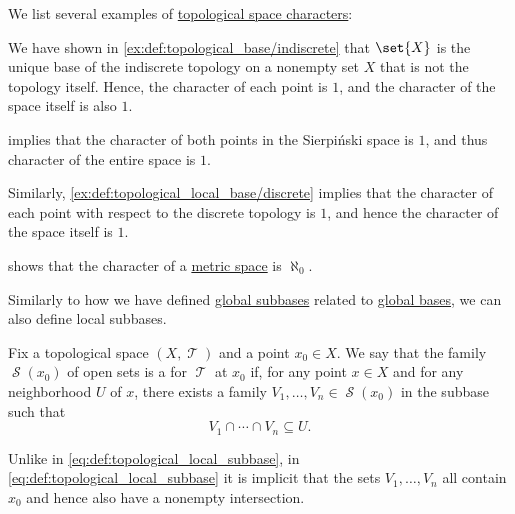 \begin{example}\label{ex:def:topological_space_character}
  We list several examples of \hyperref[def:topological_space_character]{topological space characters}:
  \begin{thmenum}
     We have shown in \cref{ex:def:topological_base/indiscrete} that \( \set{ X } \) is the unique base of the indiscrete topology on a nonempty set \( X \) that is not the topology itself. Hence, the character of each point is \( 1 \), and the character of the space itself is also \( 1 \).

      implies that the character of both points in the Sierpi\'nski space is \( 1 \), and thus character of the entire space is \( 1 \).

     Similarly, \cref{ex:def:topological_local_base/discrete} implies that the character of each point with respect to the discrete topology is \( 1 \), and hence the character of the space itself is \( 1 \).

      shows that the character of a \hyperref[def:metric_space]{metric space} is \( \aleph_0 \).
  \end{thmenum}
\end{example}

\begin{definition}\label{def:topological_local_subbase}\mimprovised
  Similarly to how we have defined \hyperref[def:topological_subbase]{global subbases} related to \hyperref[def:topological_base]{global bases}, we can also define local subbases.

  Fix a topological space \( (X, \mscrT) \) and a point \( x_0 \in X \). We say that the family \( \mscrS(x_0) \) of open sets is a  for \( \mscrT \) at \( x_0 \) if, for any point \( x \in X \) and for any neighborhood \( U \) of \( x \), there exists a family \( V_1, \ldots, V_n \in \mscrS(x_0) \) in the subbase such that
  \begin{equation}\label{eq:def:topological_local_subbase}
    V_1 \cap \cdots \cap V_n \subseteq U.
  \end{equation}
\end{definition}
\begin{comments}
  \item Unlike in \eqref{eq:def:topological_local_subbase}, in \eqref{eq:def:topological_local_subbase} it is implicit that the sets \( V_1, \ldots, V_n \) all contain \( x_0 \) and hence also have a nonempty intersection.
\end{comments}

